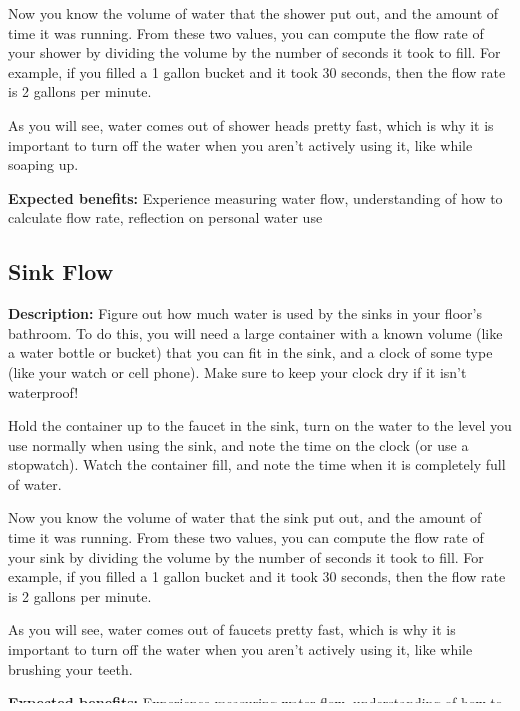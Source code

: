 Now you know the volume of water that the shower put out, and the amount of time it was running. From these two values, you can compute the flow rate of your shower by dividing the volume by the number of seconds it took to fill. For example, if you filled a 1 gallon bucket and it took 30 seconds, then the flow rate is 2 gallons per minute.

As you will see, water comes out of shower heads pretty fast, which is why it is important to turn off the water when you aren't actively using it, like while soaping up.

\vspace{2ex}
\textbf{Expected benefits:} Experience measuring water flow, understanding of how to calculate flow rate, reflection on personal water use


\subsection{Sink Flow}

\textbf{Description:} Figure out how much water is used by the sinks in your floor's bathroom. To do this, you will need a large container with a known volume (like a water bottle or bucket) that you can fit in the sink, and a clock of some type (like your watch or cell phone). Make sure to keep your clock dry if it isn't waterproof!

Hold the container up to the faucet in the sink, turn on the water to the level you use normally when using the sink, and note the time on the clock (or use a stopwatch). Watch the container fill, and note the time when it is completely full of water.

Now you know the volume of water that the sink put out, and the amount of time it was running. From these two values, you can compute the flow rate of your sink by dividing the volume by the number of seconds it took to fill. For example, if you filled a 1 gallon bucket and it took 30 seconds, then the flow rate is 2 gallons per minute.

As you will see, water comes out of faucets pretty fast, which is why it is important to turn off the water when you aren't actively using it, like while brushing your teeth.

\vspace{2ex}
\textbf{Expected benefits:} Experience measuring water flow, understanding of how to calculate flow rate, reflection on personal water use


\subsection{Climate change}

